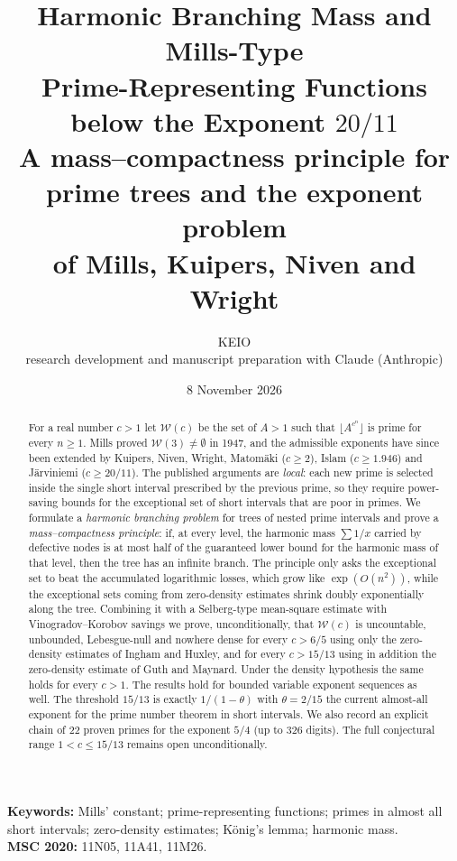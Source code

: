 \documentclass[11pt,a4paper]{article}
\title{\bfseries Harmonic Branching Mass and Mills-Type\\ Prime-Representing Functions below the Exponent $20/11$\\[6pt]
\large\normalfont A mass--compactness principle for prime trees and the exponent problem\\ of Mills, Kuipers, Niven and Wright}
\author{KEIO\\[2pt]\small research development and manuscript preparation with Claude (Anthropic)}
\date{8 November 2026}
\theoremstyle{definition}
\newcommand{\W}{\mathcal{W}}
\newcommand{\fl}[1]{\lfloor #1\rfloor}
\begin{document}
\maketitle

\begin{abstract}
For a real number $c>1$ let $\W(c)$ be the set of $A>1$ such that $\fl{A^{c^n}}$ is prime for every $n\ge 1$.
Mills proved $\W(3)\neq\emptyset$ in 1947, and the admissible exponents have since been extended by
Kuipers, Niven, Wright, Matomäki ($c\ge 2$), Islam ($c\ge 1.946$) and Järviniemi ($c\ge 20/11$).
The published arguments are \emph{local}: each new prime is selected inside the single short interval
prescribed by the previous prime, so they require power-saving bounds for the exceptional set of
short intervals that are poor in primes.
We formulate a \emph{harmonic branching problem} for trees of nested prime intervals and prove a
\emph{mass--compactness principle}: if, at every level, the harmonic mass $\sum 1/x$ carried by
defective nodes is at most half of the guaranteed lower bound for the harmonic mass of that level, then the
tree has an infinite branch. The principle only asks the exceptional set to beat the accumulated logarithmic losses,
which grow like $\exp(O(n^2))$, while the exceptional sets coming from zero-density estimates shrink
doubly exponentially along the tree. Combining it with a Selberg-type mean-square estimate with
Vinogradov--Korobov savings we prove, unconditionally, that $\W(c)$ is uncountable, unbounded,
Lebesgue-null and nowhere dense for every $c>6/5$ using only the zero-density estimates of Ingham and
Huxley, and for every $c>15/13$ using in addition the zero-density estimate of Guth and Maynard.
Under the density hypothesis the same holds for every $c>1$. The results hold for bounded variable
exponent sequences as well. The threshold $15/13$ is exactly $1/(1-\theta)$ with $\theta=2/15$ the
current almost-all exponent for the prime number theorem in short intervals.
We also record an explicit chain of $22$ proven primes for the exponent $5/4$ (up to $326$ digits).
The full conjectural range $1<c\le 15/13$ remains open unconditionally.
\end{abstract}

\noindent\textbf{Keywords:} Mills' constant; prime-representing functions; primes in almost all short intervals;
zero-density estimates; König's lemma; harmonic mass.\\
\noindent\textbf{MSC 2020:} 11N05, 11A41, 11M26.

\tableofcontents
\end{document}
